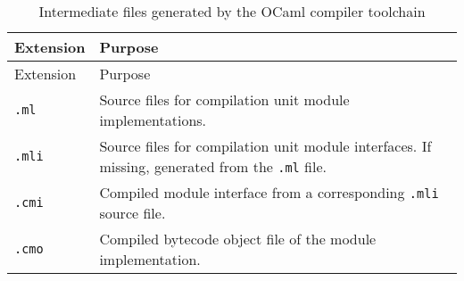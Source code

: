 \hypertarget{Table2301}{}
\begin{longtable}[]{@{}ll@{}}
\caption{Intermediate files generated by the OCaml compiler
toolchain}\tabularnewline
\toprule
\begin{minipage}[b]{0.52\columnwidth}\raggedright
Extension\strut
\end{minipage} & \begin{minipage}[b]{0.42\columnwidth}\raggedright
Purpose\strut
\end{minipage}\tabularnewline
\midrule
\endfirsthead
\toprule
\begin{minipage}[b]{0.52\columnwidth}\raggedright
Extension\strut
\end{minipage} & \begin{minipage}[b]{0.42\columnwidth}\raggedright
Purpose\strut
\end{minipage}\tabularnewline
\midrule
\endhead
\begin{minipage}[t]{0.52\columnwidth}\raggedright
\passthrough{\lstinline!.ml!}\strut
\end{minipage} & \begin{minipage}[t]{0.42\columnwidth}\raggedright
Source files for compilation unit module implementations.\strut
\end{minipage}\tabularnewline
\begin{minipage}[t]{0.52\columnwidth}\raggedright
\passthrough{\lstinline!.mli!}\strut
\end{minipage} & \begin{minipage}[t]{0.42\columnwidth}\raggedright
Source files for compilation unit module interfaces. If missing,
generated from the \passthrough{\lstinline!.ml!} file.\strut
\end{minipage}\tabularnewline
\begin{minipage}[t]{0.52\columnwidth}\raggedright
\passthrough{\lstinline!.cmi!}\strut
\end{minipage} & \begin{minipage}[t]{0.42\columnwidth}\raggedright
Compiled module interface from a corresponding
\passthrough{\lstinline!.mli!} source file.\strut
\end{minipage}\tabularnewline
\begin{minipage}[t]{0.52\columnwidth}\raggedright
\passthrough{\lstinline!.cmo!}\strut
\end{minipage} & \begin{minipage}[t]{0.42\columnwidth}\raggedright
Compiled bytecode object file of the module implementation.\strut
\end{minipage}\tabularnewline

\end{longtable}
